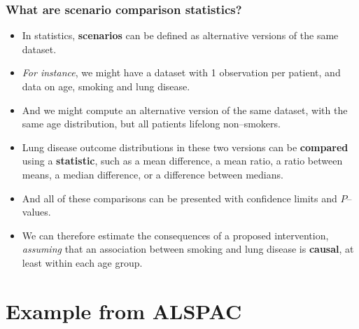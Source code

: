 \documentclass[11pt]{beamer}
\begin{document}
\begin{frame}
\frametitle{What are scenario comparison statistics?}

\begin{itemize}

\item<2-> In statistics, \textbf{scenarios} can be defined as alternative versions of the same dataset.

\item<3-> \textit{For instance}, we might have a dataset with 1 observation per patient,
and data on age, smoking and lung disease.

\item<4-> And we might compute an alternative version of the same dataset, with the same age distribution,
but all patients lifelong non--smokers.

\item<5-> Lung disease outcome distributions in these two versions can be \textbf{compared} using a \textbf{statistic},
such as a mean difference, a mean ratio, a ratio between means,
a median difference, or a difference between medians.

\item<6-> And all of these comparisons can be presented with confidence limits and $P$--values.

\item<7-> We can therefore estimate the consequences of a proposed intervention,
\textit{assuming} that an association between smoking and lung disease is \textbf{causal},
at least within each age group.

\end{itemize}

\end{frame}

\section{Example from ALSPAC}
\end{document}
